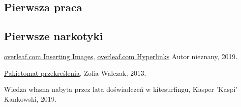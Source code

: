 \documentclass{article}
\begin{document}
	\subsection{Pierwsza praca}
	
	\subsection{Pierwsze narkotyki}
	
	\newpage
	\listoffigures
	\newpage
	\listoftables
	\newpage

	
	\begin{thebibliography}{9}
		\href{https://www.overleaf.com/learn/latex/Inserting_Images}{overleaf.com 			Inserting Images}, \href{https://www.overleaf.com/learn/latex/Hyperlinks}{overleaf.com 			Hyperlinks} Autor nieznany, 2019.
		
		\href{https://pakietomat.wordpress.com/tag/przekreslenia/}{Pakietomat przekreślenia}, Zofia Walczak, 2013.
		
		Wiedza własna nabyta przez lata doświadczeń w kitesurfingu, Kasper 'Kaspi' Kankowski, 2019.

		
	\end{thebibliography} 
\end{document}
